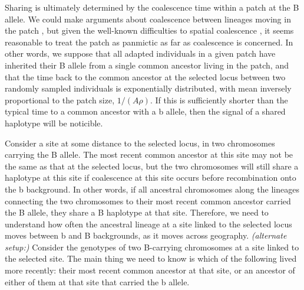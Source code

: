 \documentclass{article}
\newcommand{\plr}[1]{{\it\color{blue}(#1)}}
\begin{document}
Sharing is ultimately determined by the coalescence time within a patch at the B allele.
We could make arguments about coalescence between lineages moving in the patch \citep[as in][]{hallatschek},
but given the well-known difficulties to spatial coalescence \citep{felsenstein1978pain,bartonetheridgedepaulis},
it seems reasonable to treat the patch as panmictic as far as coalescence is concerned.
In other words, we suppose that all adapted individuals in a given patch have inherited their B allele from a single common ancestor living in the patch,
and that the time back to the common ancestor at the selected locus between two randomly sampled individuals
is exponentially distributed, with mean inversely proportional to the patch size, $1/(A\rho)$.
If this is sufficiently shorter than the typical time to a common ancestor with a b allele,
then the signal of a shared haplotype will be noticible.

Consider a site at some distance to the selected locus, in two chromosomes carrying the B allele.
The most recent common ancestor at this site may not be the same as that at the selected locus,
but the two chromosomes will still share a haplotype at this site
if coalescence at this site occurs before recombination onto the b background.
In other words, if all ancestral chromosomes along the lineages connecting the two chromosomes to their most recent common ancestor
carried the B allele,
they share a B haplotype at that site.
Therefore, we need to understand how often the ancestral lineage at a site linked to the selected locus
moves between b and B backgrounds, as it moves across geography.
\plr{alternate setup:}
Consider the genotypes of two B-carrying chromosomes at a site linked to the selected site.
The main thing we need to know is which of the following lived more recently:
their most recent common ancestor at that site,
or an ancestor of either of them at that site that carried the b allele.
\end{document}
